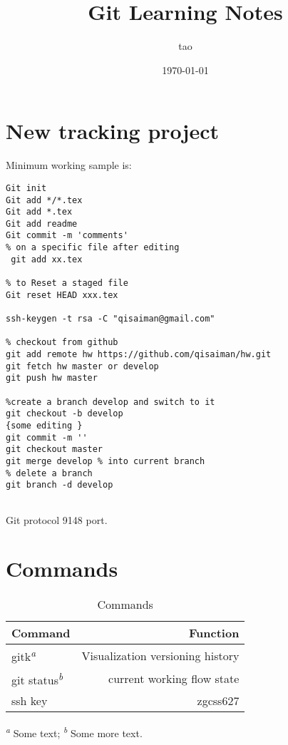 \documentclass[12pt,letterpaper]{article}
\title{Git Learning Notes}
\author{tao}
\date{\today}
\begin{document}
\maketitle
\section{New tracking project}
Minimum working sample is:
\begin{lstlisting}
Git init
Git add */*.tex
Git add *.tex
Git add readme
Git commit -m 'comments'
% on a specific file after editing
 git add xx.tex

% to Reset a staged file
Git reset HEAD xxx.tex

ssh-keygen -t rsa -C "qisaiman@gmail.com"

% checkout from github 
git add remote hw https://github.com/qisaiman/hw.git
git fetch hw master or develop 
git push hw master

%create a branch develop and switch to it
git checkout -b develop
{some editing }
git commit -m ''
git checkout master 
git merge develop % into current branch 
% delete a branch
git branch -d develop 


\end{lstlisting}

Git protocol 9148 port. 

\section{Commands}

\begin{table}[htb]
  \caption{Commands}\label{tbl:notes}
  \centering
  \begin{tabular}{lr}
    \toprule
    Command                            & Function \\
    \midrule
    gitk\textsuperscript{\emph{a}}   & Visualization versioning history  \\
    git status\textsuperscript{\emph{b}} & current working flow state \\
    ssh key   & zgcss627\\
    
    \bottomrule
  \end{tabular}

  \textsuperscript{\emph{a}} Some text;
  \textsuperscript{\emph{b}} Some more text.
\end{table}
\end{document}
